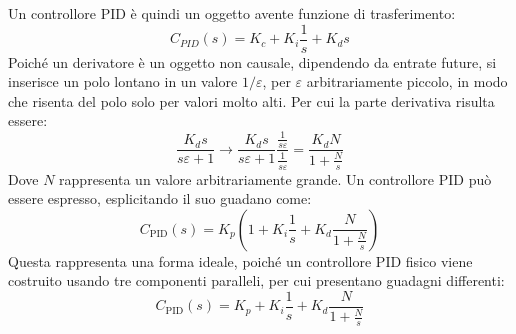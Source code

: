 \documentclass{article}
\numberwithin{equation}{subsection}
\begin{document}
Un controllore PID è quindi un 
oggetto avente funzione di trasferimento: 
\begin{equation}
    C_{PID}(s)=K_c+K_i\displaystyle\frac{1}{s}+K_d s
\end{equation}
Poiché un derivatore è un oggetto non causale, dipendendo da entrate future, si 
inserisce un polo lontano in un valore 
${1}/{\varepsilon}$, per $\varepsilon$ arbitrariamente piccolo, in modo che risenta del polo solo per valori molto alti. Per cui la parte derivativa risulta essere: 
\begin{equation*}
    \displaystyle\frac{K_d s}{s\varepsilon+1}\to \displaystyle\frac{K_d s}{s\varepsilon+1}\frac{\displaystyle\frac{1}{s\varepsilon}}{\displaystyle\frac{1}{s\varepsilon}}=\frac{K_dN}{1+\displaystyle\frac{N}{s}}
\end{equation*}
Dove 
$N$ rappresenta un valore arbitrariamente grande. 
Un controllore PID può essere espresso, esplicitando il suo guadano come: 
\begin{equation}
    C_\mathrm{PID}(s)=K_p\left(1+K_i\displaystyle\frac{1}{s}+K_d\frac{N}{1+\displaystyle\frac{N}{s}}\right)
\end{equation}
Questa rappresenta una forma ideale, poiché un controllore PID fisico viene costruito usando tre componenti paralleli, per cui presentano guadagni differenti:
\begin{equation*}
    C_\mathrm{PID}(s)=K_p+K_i\displaystyle\frac{1}{s}+K_d\frac{N}{1+\displaystyle\frac{N}{s}}
\end{equation*}
\end{document}
